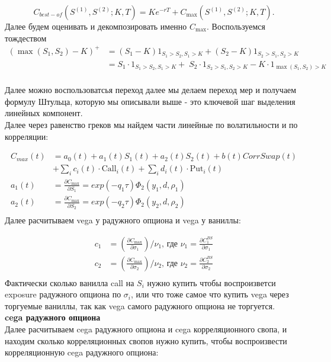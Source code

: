 \begin{equation}
C_{best-of}(S^{(1)}, S^{(2)}; K, T)
=
K e^{-rT}
+
C_{\max}(S^{(1)}, S^{(2)}; K, T).
\end{equation}
Далее будем оценивать и декомпозировать именно $C_{\max}$.
Воспользуемся тождеством
\begin{equation}
\label{eq:max_to_plus_transform}
\begin{aligned}
(\max(S_1,S_2) - K)^{+}
&= (S_1 - K)1_{S_1 > S_2, S_1 > K} + (S_2 - K)1_{S_2 > S_1, S_2 > K} \\
&= S_1 \cdot 1_{S_1 > S_2, S_1 > K} + \; S_2 \cdot 1_{S_2 > S_1, S_2 > K} - K\cdot 1_{\max(S_1,S_2) > K} \\
\end{aligned}
\end{equation}

Далее можно воспользоватсья переход далее мы делаем переход мер и получаем формулу Штульца,
которую мы описывали выше - это ключевой шаг выделения линейных компонент. \\
Далее через равенство греков мы найдем части линейные по волатильности и по корреляции:

\begin{equation}
\begin{aligned}
C_{max}(t) 
&= a_0(t)+ a_1(t) S_1(t) + a_2(t) S_2(t) + b(t) CorrSwap(t) \\
&+ \sum_i c_i(t) \cdot \text{Call}_i(t) + \sum_i d_i(t) \cdot \text{Put}_i(t) \\
a_1(t) &= \frac{\partial C_{\max}}{\partial S_1} = exp(-q_1 \tau) \Phi_2(y_1, d, \rho_1) \\
a_2(t) &= \frac{\partial C_{\max}}{\partial S_2} = exp(-q_2 \tau) \Phi_2(y_2, d, \rho_2) \\
\end{aligned}
\end{equation}
Далее расчитываем vega у радужного опциона и vega у ваниллы:

\begin{equation}
\begin{aligned}
c_1 &= (\frac{\partial C_{\max}}{\partial \sigma_1}) / \nu_1 \text{, где } \nu_1 = \frac{\partial C_1^{BS}}{\partial \sigma_1} \\
c_2 &= (\frac{\partial C_{\max}}{\partial \sigma_2}) / \nu_2 \text{, где } \nu_2 = \frac{\partial C_2^{BS}}{\partial \sigma_2} \\
\end{aligned}
\end{equation}
Фактически сколько ванилла call на $S_i$ нужно купить чтобы воспроизветси exposure радужного 
опциона по $\sigma_i$, или что тоже самое что купить vega через торгуемые ваниллы, так как 
vega самого радужного опциона не торгуется. \\
\textbf{cega радужного опциона} \\
Далее расчитываем cega радужного опциона и cega корреляционного свопа,
 и находим сколько корреляционных свопов нужно купить, чтобы воспроизвести корреляционную 
 cega радужного опциона:

